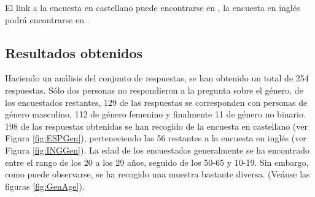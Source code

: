\documentclass[12pt, a4paper,twoside,titlepage]{book}
\begin{document}
El link a la encuesta en castellano puede encontrarse en , la encuesta en inglés podrá encontrarse en .

\subsection{Resultados obtenidos}


Haciendo un análisis del conjunto de respuestas, se han obtenido un total de 254 respuestas. Sólo dos personas no respondieron a la pregunta sobre el género, de los encuestados restantes, 129 de las respuestas se corresponden con personas de género masculino, 112 de género femenino y finalmente 11 de género no binario. 198 de las respuestas obtenidas se han recogido de la encuesta en castellano (ver Figura \ref{fig:ESPGen}), perteneciendo las 56 restantes a la encuesta en inglés (ver Figura \ref{fig:INGGen}). 
La edad de los encuestados generalmente se ha encontrado entre el rango de los 20 a los 29 años, seguido de los 50-65 y 10-19. Sin embargo, como puede observarse, se ha recogido una muestra bastante diversa. (Veánse las figuras \ref{fig:GenAge}). 
\end{document}
